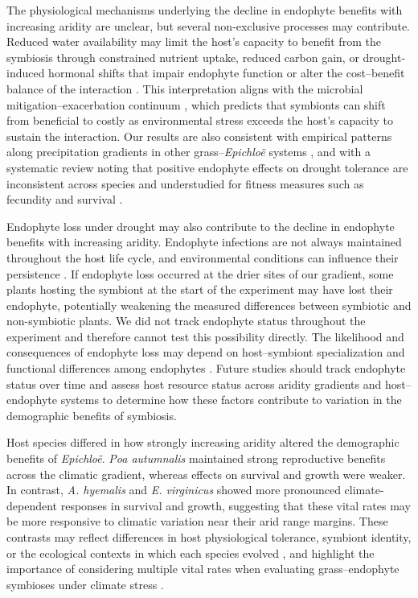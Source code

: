 \documentclass[12pt]{article}\usepackage[]{graphicx}\usepackage[dvipsnames]{xcolor}
\begin{document}
The physiological mechanisms underlying the decline in endophyte benefits with increasing aridity are unclear, but several non-exclusive processes may contribute.
Reduced water availability may limit the host's capacity to benefit from the symbiosis through constrained nutrient uptake, reduced carbon gain, or drought-induced hormonal shifts that impair endophyte function or alter the cost--benefit balance of the interaction \citep{ahlholm2002vertically, bronstein2001exploitation, faeth2002endophytic, bastias2024epichloe, cui2022abscisic}.
This interpretation aligns with the microbial mitigation--exacerbation continuum \citep{david2018microbial}, which predicts that symbionts can shift from beneficial to costly as environmental stress exceeds the host's capacity to sustain the interaction. 
Our results are also consistent with empirical patterns along precipitation gradients in other grass--\textit{Epichloë} systems \citep{rudgers2009benefits}, and with a systematic review noting that positive endophyte effects on drought tolerance are inconsistent across species and understudied for fitness measures such as fecundity and survival \citep{decunta2021systematic}.

Endophyte loss under drought may also contribute to the decline in endophyte benefits with increasing aridity.
Endophyte infections are not always maintained throughout the host life cycle, and environmental conditions can influence their persistence \citep{afkhami2008symbiosis,david2019testing}.
If endophyte loss occurred at the drier sites of our gradient, some plants hosting the symbiont at the start of the experiment may have lost their endophyte, potentially weakening the measured differences between symbiotic and non-symbiotic plants.
We did not track endophyte status throughout the experiment and therefore cannot test this possibility directly. The likelihood and consequences of endophyte loss may depend on host--symbiont specialization and functional differences among endophytes \citep{saona2010environmental}. Future studies should track endophyte status over time and assess host resource status across aridity gradients and host--endophyte systems to determine how these factors contribute to variation in the demographic benefits of symbiosis.

Host species differed in how strongly increasing aridity altered the demographic benefits of \textit{Epichloë}.
\textit{Poa autumnalis} maintained strong reproductive benefits across the climatic gradient, whereas effects on survival and growth were weaker.
In contrast, \textit{A. hyemalis} and \textit{E. virginicus} showed 
more pronounced climate-dependent responses in survival and growth, suggesting that these vital rates may be more responsive to climatic variation near their arid range margins.
These contrasts may reflect differences in host physiological tolerance, symbiont identity, or the ecological contexts in which each species evolved \citep{decunta2021systematic}, and highlight the importance of considering multiple vital rates when evaluating grass--endophyte symbioses under climate stress \citep{cheplick2009ecology}.
\end{document}

